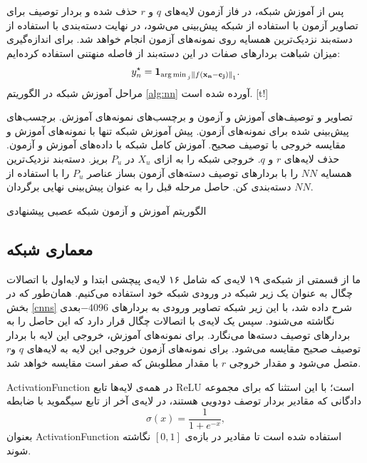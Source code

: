 پس از آموزش شبکه، در فاز آزمون لایه‌های $q$ و $r$ حذف شده و بردار توصیف برای تصاویر آزمون با استفاده از شبکه پیش‌بینی می‌شود، در نهایت دسته‌بندی با استفاده از دسته‌بند نزدیک‌ترین همسایه روی نمونه‌های آزمون انجام خواهد شد. برای اندازه‌گیری میزان شباهت بردارهای صفات در این دسته‌بند از فاصله منهتنی استفاده کرده‌ایم:
\begin{equation}
y^{\star}_n = \mathbf{1}_{\operatorname*{arg\,min\,}_{j} \left \lVert f(\mathbf{x_n - c_j}) \right \rVert_1} .
\end{equation}
مراحل آموزش شبکه در الگوریتم \ref{alg:nn} آورده شده است.
[t!]
	\begin{enumerate}[label={\arabic*},itemsep=.1em, parsep=.1em]
 تصاویر و توصیف‌های آموزش و آزمون و برچسب‌های نمونه‌های آموزش.
 برچسب‌های پیش‌بینی شده برای نمونه‌های آزمون.
 پیش آموزش شبکه تنها با نمونه‌های آموزش و مقایسه خروجی با توصیف صحیح.
 آموزش کامل شبکه با داده‌های آموزش و آزمون.
 حذف لایه‌های $r$ و $q$.
 خروجی شبکه را به ازای $X_u$ در $P_u$ بریز.
 دسته‌بند نزدیک‌ترین همسایه $NN$ را با بردارهای توصیف دسته‌های آزمون بساز
 عناصر $P_u$ را با استفاده از $NN$ دسته‌بندی کن.
 حاصل مرحله قبل را به عنوان پیش‌بینی نهایی برگردان.
\end{enumerate}
\caption{الگوریتم آموزش و آزمون شبکه عصبی پیشنهادی}
\label{alg:nn}
\subsection{معماری شبکه}\label{net_architechture}
ما از قسمتی از شبکه‌ی ۱۹ لایه‌ی  \cite{vgg} که شامل ۱۶ لایه‌ی پیچشی ابتدا و لایه‌‌‌اول با اتصالات چگال به عنوان یک زیر شبکه در ورودی شبکه خود استفاده می‌کنیم. همان‌طور که در بخش
\ref{cnns}
شرح داده شد،
 با این زیر شبکه تصاویر ورودی به بردارهای $-4096$بعدی نگاشته می‌شنود. سپس یک لایه‌ی با اتصالات چگال قرار دارد که این حاصل را به بردارهای توصیف دسته‌ها می‌نگارد. برای نمونه‌های آموزش، خروجی این لایه با بردار توصیف صحیح مقایسه می‌شود. برای نمونه‌های آزمون خروجی این لایه به  لایه‌های  $q$ و$r$ متصل می‌شود و مقدار خروجی $r$ با مقدار مطلوبش که صفر است مقایسه خواهد شد.

\gls{ActivationFunction} در همه‌ی لایه‌ها تابع \gls{ReLU} است؛ با این استثنا که برای مجموعه‌ دادگانی که مقادیر بردار توصف دودویی هستند، در لایه‌ی آخر از تابع سیگموید با ضابطه
\begin{equation}
\sigma(x) = \frac{1}{1 + e^{-x}},
\end{equation}
بعنوان \gls{ActivationFunction} استفاده شده است تا مقادیر در بازه‌ی $[0,1]$ نگاشته شوند.

